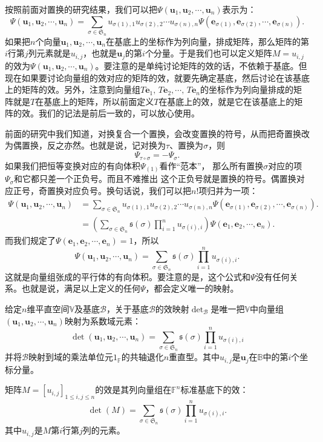 \documentclass[12pt,UTF8,fontset=none]{ctexbook}
\begin{document}
按照前面对置换的研究结果，我们可以把$\varPsi(\mathbf{u}_1, \mathbf{u}_2,\cdots,\mathbf{u}_n)$表示为：
$$
\varPsi(\mathbf{u}_1, \mathbf{u}_2,\cdots,\mathbf{u}_n) = \sum_{\sigma\in\mathfrak{S}_n} u_{\sigma(1),1}u_{\sigma(2),2}\cdots u_{\sigma(n),n}\varPsi(\mathbf{e}_{\sigma(1)}, \mathbf{e}_{\sigma(2)},\cdots,\mathbf{e}_{\sigma(n)}).
$$
如果把$n$个向量$\mathbf{u}_1, \mathbf{u}_2,\cdots,\mathbf{u}_n$在基底上的坐标作为列向量，排成矩阵，那么矩阵的第$i$行第$j$列元素就是$u_{i,j}$，也就是$\mathbf{u}_j$的第$i$个分量。于是我们也可以定义矩阵$M = u_{i,j}$的效为$\varPsi(\mathbf{u}_1, \mathbf{u}_2,\cdots,\mathbf{u}_n)$。要注意的是单纯讨论矩阵的效的话，不依赖于基底。但现在如果要讨论向量组的效对应的矩阵的效，就要先确定基底，然后讨论在该基底上的矩阵的效。另外，注意到向量组$T\mathbf{e}_1, \,T\mathbf{e}_2,\cdots,\,T\mathbf{e}_n$的坐标作为列向量排成的矩阵就是$T$在基底上的矩阵，所以前面定义$T$在基底上的效，就是它在该基底上的矩阵的效。我们的记法是前后一致的，可以放心使用。

前面的研究中我们知道，对换复合一个置换，会改变置换的符号，从而把奇置换改为偶置换，反之亦然。也就是说，记对换为$\tau$、置换为$\sigma$，则
$$\varPsi_{\tau\circ\sigma} = -\varPsi_{\sigma}.$$
如果我们把恒等变换对应的有向体积$\varPsi_{(1)}$看作“范本”，
那么所有置换$\sigma$对应的项$\varPsi_{\sigma}$和它都只差一个正负号。而且不难推出
这个正负号就是置换的符号。偶置换对应正号，奇置换对应负号。换句话说，我们可以把$n!$项归并为一项：
\begin{align*}
    \varPsi(\mathbf{u}_1, \mathbf{u}_2,\cdots,\mathbf{u}_n) &= \sum_{\sigma\in\mathfrak{S}_n} u_{\sigma(1),1}u_{\sigma(2),2}\cdots u_{\sigma(n),n} \varPsi\left(\mathbf{e}_{\sigma(1)}, \mathbf{e}_{\sigma(2)}, \cdots, \mathbf{e}_{\sigma(n)}\right).  \\
    &= \left(\sum_{\sigma\in\mathfrak{S}_n} \mathfrak{s}(\sigma) \prod_{i=1}^n u_{\sigma(i),i} \right) \varPsi\left(\mathbf{e}_{1}, \mathbf{e}_{2}, \cdots, \mathbf{e}_{n}\right).  
\end{align*}
而我们规定了$\varPsi\left(\mathbf{e}_{1}, \mathbf{e}_{2}, \cdots, \mathbf{e}_{n}\right) = 1$，所以
$$ 
\varPsi(\mathbf{u}_1, \mathbf{u}_2,\cdots,\mathbf{u}_n) = \sum_{\sigma\in\mathfrak{S}_n} \mathfrak{s}(\sigma) \prod_{i=1}^n u_{\sigma(i),i} .
$$
这就是向量组张成的平行体的有向体积。要注意的是，这个公式和$\varPsi$没有任何关系。也就是说，满足以上定义的任何$\varPsi$，都会定义唯一的映射。
\begin{df}\label{df:10_3}
给定$n$维平直空间$\mathbb{V}$及基底$\mathcal{B}$，关于基底$\mathcal{B}$的效映射$\det_\mathcal{B}$是唯一把$\mathbb{V}$中向量组$(\mathbf{u}_1, \mathbf{u}_2,\cdots,\mathbf{u}_n)$映射为系数域元素：
$$
\det(\mathbf{u}_1, \mathbf{u}_2,\cdots,\mathbf{u}_n) = \sum_{\sigma\in\mathfrak{S}_n} \mathfrak{s}(\sigma) \prod_{i=1}^n u_{\sigma(i),i}
$$
并将$\mathcal{B}$映射到域的乘法单位元$1_{\mathbb{F}}$的共轴退化$n$重直型。其中$u_{i,j}$是$\mathbf{u}_j$在$\mathbb{B}$中的第$i$个坐标分量。

矩阵$M = [u_{i,j}]_{1\leqslant i,j\leqslant n}$的效是其列向量组在$\mathbb{F}^n$标准基底下的效：
$$
\det(M) = \sum_{\sigma\in\mathfrak{S}_n} \mathfrak{s}(\sigma) \prod_{i=1}^n u_{\sigma(i),i}.
$$
其中$u_{i,j}$是$M$第$i$行第$j$列的元素。
\end{df}
\end{document}
